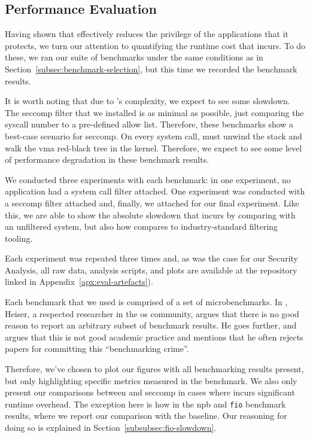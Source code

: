 \subsection{Performance Evaluation}\label{subsec:perf-eval}

Having shown that \af effectively reduces the privilege of the applications that
it protects, we turn our attention to quantifying the runtime cost that \af
incurs. To do these, we ran our suite of benchmarks under the same
conditions as in Section~\ref{subsec:benchmark-selection}, but this time we
recorded the benchmark results. 

It is worth noting that due to \af's complexity, we expect to see some slowdown.
The seccomp filter that we installed is as minimal as possible, just comparing
the syscall number to a pre-defined allow list. Therefore, these benchmarks show
a best-case scenario for seccomp. On every system call, \af must unwind the
stack and walk the \ac{vma} red-black tree in the kernel. Therefore, we expect
to see some level of performance degradation in these benchmark results.

We conducted three experiments with each benchmark: in one experiment, no
application had a system call filter attached. One experiment was conducted with
a seccomp filter attached and, finally, we attached \af for our final
experiment. Like this, we are able to show the absolute slowdown that \af
incurs by comparing with an unfiltered system, but also how \af compares to
industry-standard filtering tooling.

Each experiment was repeated three times and, as was the case for our Security
Analysis, all raw data, analysis scripts, and plots are available at the
repository linked in Appendix~\ref{apx:eval-artefacts}).

Each benchmark that we used is comprised of a set of microbenchmarks. In
\textcite{HeiserBenchmarkingCrimes}, Heiser, a respected researcher in the
\ac{os} community, argues that there is no good reason to report an arbitrary
subset of benchmark results. He goes further, and argues that this is not good
academic practice and mentions that he often rejects papers for committing this
``benchmarking crime''. 

Therefore, we've chosen to plot our figures with all benchmarking results
present, but only highlighting specific metrics measured in the benchmark. We
also only present our comparisons between \af and seccomp in cases where \af
incurs significant runtime overhead. The exception here is how in the \ac{npb}
and \texttt{fio} benchmark results, where we report our comparison with the
baseline. Our reasoning for doing so is explained in 
Section~\ref{subsubsec:fio-slowdown}. 

